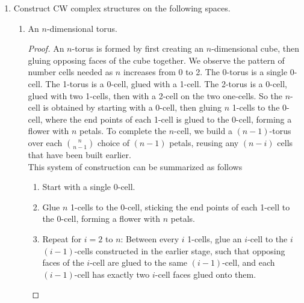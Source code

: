 \documentclass{article}
\begin{document}
\begin{enumerate}
\begin{enumerate}
\begin{proof}
          By similar argument, any subset of $P$ must also be closed in
          $X$, which means that $P$ as a subset of $X$ has the discrete
          topology. Yet, $P$ is infinite, so it cannot be compact, which is
          a contradiction because $P$ is a closed subset of a compact space
          $C$, and should be compact.
        \end{proof}
    \end{enumerate}

  \item Construct CW complex structures on the following spaces.
    \begin{enumerate}
      \item An $n$-dimensional torus.
        \begin{proof}
          An $n$-torus is formed by first creating an $n$-dimensional cube,
          then gluing opposing faces of the cube together. We observe the
          pattern of number cells needed as $n$ increases from 0 to 2. The
          0-torus is a single 0-cell. The 1-torus is a 0-cell, glued with a
          1-cell. The 2-torus is a 0-cell, glued with two 1-cells, then
          with a 2-cell on the two one-cells. So the $n$-cell is obtained
          by starting with a 0-cell, then gluing $n$ 1-cells to the 0-cell,
          where the end points of each 1-cell is glued to the 0-cell,
          forming a flower with $n$ petals. To complete the $n$-cell, we
          build a $(n-1)$-torus over each $\binom{n}{n-1}$ choice of
          $(n-1)$ petals, reusing any $(n-i)$ cells that have been built
          earlier. \\

          This system of construction can be summarized as follows
          \begin{enumerate}
            \item Start with a single 0-cell.
            \item Glue $n$ 1-cells to the 0-cell, sticking the end points
              of each 1-cell to the 0-cell, forming a flower with $n$
              petals.
            \item Repeat for $i=2$ to $n$: Between every $i$
              1-cells, glue an $i$-cell to the $i$ $(i-1)$-cells
              constructed in the earlier stage, such that opposing faces of
              the $i$-cell are glued to the same $(i-1)$-cell, and each
              $(i-1)$-cell has exactly two $i$-cell faces glued onto them.
          \end{enumerate}


\end{proof}
\end{enumerate}
\end{enumerate}
\end{document}
